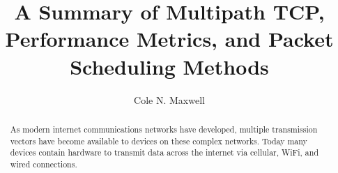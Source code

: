 \documentclass[sigplan,screen,nonacm]{acmart}
\begin{document}
\title{A Summary of Multipath TCP, Performance Metrics, and Packet Scheduling Methods}

\author{Cole N. Maxwell}


\begin{abstract}
As modern internet communications networks have developed, multiple transmission vectors have become
available to devices on these complex networks. Today many devices contain hardware to transmit data 
across the internet via cellular, WiFi, and wired connections.

\end{abstract}

\doclicenseThis




\maketitle
\end{document}
